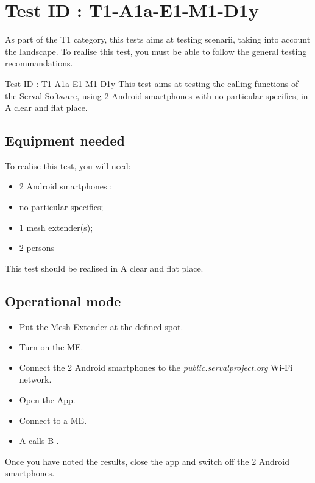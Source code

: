 \documentclass[oneside]{book}
\begin{document}
\section{Test ID : T1-A1a-E1-M1-D1y}
\begin{itshape}
As part of the T1 category, this tests aims at testing scenarii, taking into account the landscape. 
To realise this test, you must be able to follow the general testing recommandations.
\end{itshape}
\newline
Test ID : T1-A1a-E1-M1-D1y
 This test aims at testing the calling functions of the Serval Software, using 2 Android smartphones with no particular specifics, in A clear and flat place.
\subsection{Equipment needed} To realise this test, you will need:
\begin{itemize}
\item 2 Android smartphones ;
\item no particular specifics;
\item 1 mesh extender(s);
\item 2 persons
\end{itemize}
This test should be realised in A clear and flat place.
\subsection{Operational mode} \begin{itemize}
\item Put the Mesh Extender at the defined spot.
\item Turn on the ME.
\item Connect the 2 Android smartphones to the \emph{public.servalproject.org} Wi-Fi network.
\item Open the App.
\item Connect to a ME.
\item A calls B .
\end{itemize}
Once you have noted the results, close the app and switch off the 2 Android smartphones.
\end{document}
